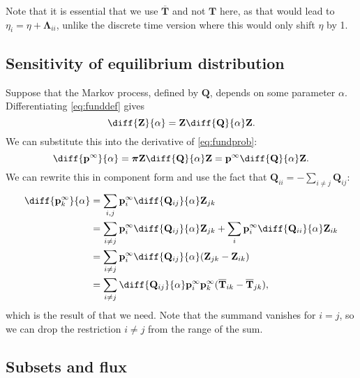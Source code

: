 \documentclass{article} %
\newcommand{\MM}{\mathbf{Q}}
\newcommand{\pr}{\mathbf{p}}
\newcommand{\eq}{\pr^\infty}
\newcommand{\fpt}{\mathbf{T}}
\newcommand{\fptb}{\overline{\fpt}}
\newcommand{\fund}{\mathbf{Z}}
\newcommand{\pib}{\boldsymbol{\pi}}
\newcommand{\Lb}{\boldsymbol{\Lambda}}
\begin{document}
Note that it is essential that we use $\fptb$ and not $\fpt$ here, as that would lead to $\eta_i=\eta+\Lb_{ii}$, unlike the discrete time version \cite{hunter2006mixing} where this would only shift $\eta$ by 1.

\subsection{Sensitivity of equilibrium distribution}\label{sec:sensitivity}

Suppose that the Markov process, defined by $\MM$, depends on some parameter $\alpha$.
Differentiating \eqref{eq:funddef} gives
%
\begin{equation}\label{eq:diffZ}
  \diff{\fund}{\alpha} = \fund \diff{\MM}{\alpha} \fund.
\end{equation}
%
We can substitute this into the derivative of \eqref{eq:fundprob}:
%
\begin{equation}\label{eq:diffp}
  \diff{\eq}{\alpha} = \pib \fund \diff{\MM}{\alpha} \fund = \eq \diff{\MM}{\alpha} \fund.
\end{equation}
%
We can rewrite this in component form and use the fact that $\MM_{ii} = - \sum_{i\neq j} \MM_{ij}$:
%
\begin{equation}\label{eq:diffpT}
\begin{aligned}
  \diff{\eq_k}{\alpha} &= \sum_{i,j} \eq_i \diff{\MM_{ij}}{\alpha} \fund_{jk} \\
    &= \sum_{i\neq j} \eq_i \diff{\MM_{ij}}{\alpha} \fund_{jk} + \sum_i \eq_i \diff{\MM_{ii}}{\alpha} \fund_{ik} \\
    &= \sum_{i\neq j} \eq_i \diff{\MM_{ij}}{\alpha} (\fund_{jk} - \fund_{ik}) \\
    &= \sum_{i\neq j} \diff{\MM_{ij}}{\alpha} \eq_i \eq_k (\fptb_{ik} - \fptb_{jk}),
\end{aligned}
\end{equation}
%
which is the result of \cite{cho2000markov} that we need.
Note that the summand vanishes for $i=j$, so we can drop the restriction $i\neq j$ from the range of the sum.

\subsection{Subsets and flux}\label{sec:subsets}
\end{document}

